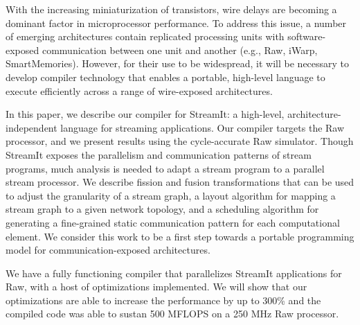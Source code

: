 With the increasing miniaturization of transistors, wire delays are
becoming a dominant factor in microprocessor performance.  To address
this issue, a number of emerging architectures contain replicated
processing units with software-exposed communication between one unit
and another (e.g., Raw, iWarp, SmartMemories).  However, for
their use to be widespread, it will be necessary to develop compiler
technology that enables a portable, high-level language to execute
efficiently across a range of wire-exposed architectures.

In this paper, we describe our compiler for StreamIt: a high-level,
architecture-independent language for streaming applications.  Our
compiler targets the Raw processor, and we present results using the
cycle-accurate Raw simulator.  Though StreamIt exposes the parallelism
and communication patterns of stream programs, much analysis is needed
to adapt a stream program to a parallel stream processor.  We describe
fission and fusion transformations that can be used to adjust the
granularity of a stream graph, a layout algorithm for mapping a stream
graph to a given network topology, and a scheduling algorithm for
generating a fine-grained static communication pattern for each
computational element.  We consider this work to be a first step
towards a portable programming model for communication-exposed
architectures.

We have a fully functioning compiler that parallelizes StreamIt
applications for Raw, with a host of optimizations implemented. We
will show that our optimizations are able to increase the performance
by up to 300\% and the compiled code was able to sustan 500 MFLOPS on
a 250 MHz Raw processor.
